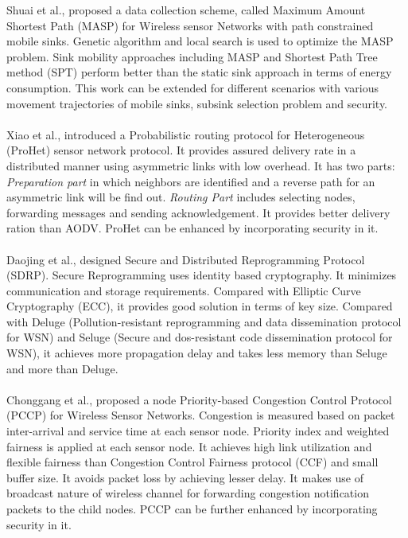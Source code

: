 \documentclass[journal]{IEEEtran}
\begin{document}
\indent Shuai et al., \cite{MASP} proposed a data collection scheme, called Maximum Amount Shortest Path (MASP) for Wireless sensor Networks with path constrained mobile sinks. Genetic algorithm and local search is used to optimize the MASP problem. Sink mobility approaches including MASP and Shortest Path Tree method (SPT) perform better than the static sink approach in terms of energy consumption. This work can be extended for different scenarios with various movement trajectories of mobile sinks, subsink selection problem and security.\\ \\
\indent Xiao et al., \cite{ProHet} introduced a Probabilistic routing protocol for Heterogeneous (ProHet) sensor network protocol. It provides assured delivery rate in a distributed manner using asymmetric links with low overhead. It has two parts: \textit{Preparation part} in which neighbors are identified and a reverse path for an asymmetric link will be find out. \textit{Routing Part} includes selecting nodes, forwarding messages and sending acknowledgement. It provides better delivery ration than AODV. ProHet can be enhanced by incorporating security in it.\\ \\  
\indent Daojing et al., \cite{SDRP} designed  Secure and Distributed Reprogramming Protocol (SDRP). Secure Reprogramming uses identity based cryptography. It minimizes communication and storage requirements. Compared with Elliptic Curve Cryptography (ECC), it provides good solution in terms of key size. Compared with Deluge (Pollution-resistant reprogramming and data dissemination protocol for WSN) and Seluge (Secure and dos-resistant code dissemination protocol for WSN), it achieves more propagation delay and takes less memory than Seluge and more than Deluge.\\ \\
\indent Chonggang et al., \cite{PCCP} proposed a node Priority-based Congestion Control Protocol (PCCP) for Wireless Sensor Networks. Congestion is measured based on packet inter-arrival and service time at each sensor node. Priority index and weighted fairness is applied at each sensor node. It achieves high link utilization and flexible fairness than Congestion Control Fairness protocol (CCF) and small buffer size. It avoids packet loss by achieving lesser delay. It makes use of broadcast nature of wireless channel for forwarding congestion notification packets to the child nodes. PCCP can be further enhanced by incorporating security in it.\\ \\
\end{document}
